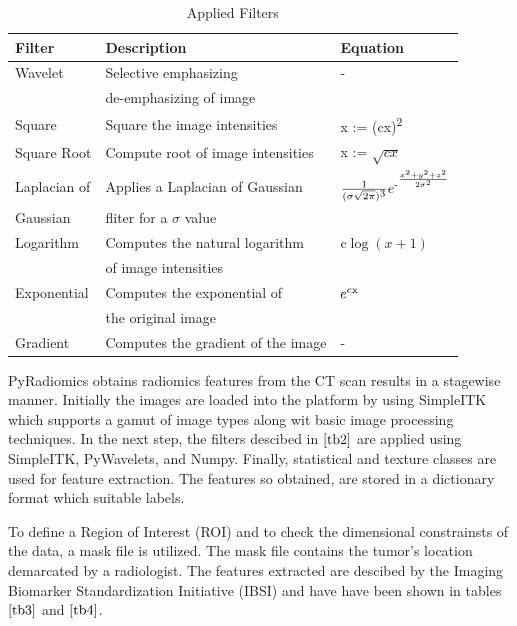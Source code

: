 \documentclass[10pt,journal,compsoc]{IEEEtran}
\newcommand\sufr[3][0pt]{$\rule{0pt}{\dimexpr#1+1.4ex\relax}^\frac{#2}{#3}$}
\begin{document}
\begin{table}[!b]
\scriptsize
\centering
\caption{Applied Filters}
\label{tb2}
\begin{tabular}{| l | l | l |}
\hline
\textbf{Filter} & \textbf{Description} & \textbf{Equation}\\
\hline
Wavelet & Selective emphasizing  & -\\
&de-emphasizing of image&\\
\hline
Square & Square the image intensities & x := (cx)\textsuperscript{2}\\
\hline
Square Root & Compute root of image intensities & x := $\sqrt{cx}$\\
\hline
Laplacian of & Applies a Laplacian of Gaussian & $\frac{1}{(\sigma\sqrt{2\pi})\textsuperscript{3}}e\textsuperscript{-\sufr{x\textsuperscript{2}+y\textsuperscript{2}+z\textsuperscript{2}}{2\sigma\textsuperscript{2}}}$\\
Gaussian &fliter for a $\sigma$ value&\\
\hline
Logarithm & Computes the natural logarithm& c$\log(x+1)$\\
& of image intensities &\\
\hline
Exponential & Computes the exponential of & $e\textsuperscript{cx}$\\
&the original image &\\
\hline
Gradient & Computes the gradient of the image & -\\
\hline
\end{tabular}
\end{table}

PyRadiomics obtains radiomics features from the CT scan results in a stagewise manner. Initially the images are loaded into the platform by using SimpleITK which supports a gamut of image types along wit basic image processing techniques. In the next step, the filters descibed in $\ref{tb2}$ are applied using SimpleITK, PyWavelets, and Numpy. Finally, statistical and texture classes are used for feature extraction. The features so obtained, are stored in a dictionary format which suitable labels. 

To define a Region of Interest (ROI) and to check the dimensional constrainsts of the data, a mask file is utilized. The mask file contains the tumor's location demarcated by a radiologist. The features extracted are descibed by the Imaging Biomarker Standardization Initiative (IBSI) and have have been shown in tables $\ref{tb3}$ and $\ref{tb4}$.
\end{document}

